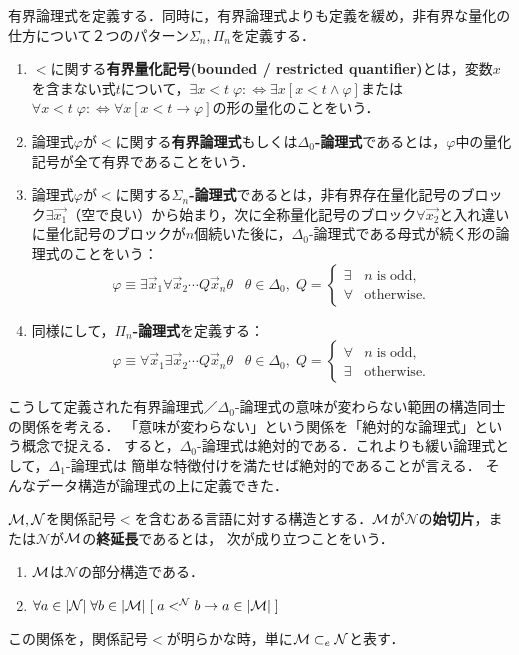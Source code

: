 \documentclass[uplatex, 12pt, dvipdfmx]{jsreport}
\begin{document}
有界論理式を定義する．同時に，有界論理式よりも定義を緩め，非有界な量化の仕方について２つのパターン$\Sigma_n,\Pi_n$を定義する．
\begin{definition}
    \begin{enumerate}
        \item $<$に関する\textbf{有界量化記号(bounded / restricted quantifier)}とは，変数$x$を含まない式$t$について，$\exists x<t\;\varphi:\Leftrightarrow\exists x[x<t\land\varphi]$または$\forall x<t\;\varphi:\Leftrightarrow\forall x[x<t\to\varphi]$の形の量化のことをいう．
        \item 論理式$\varphi$が$<$に関する\textbf{有界論理式}もしくは\textbf{$\Delta_0$-論理式}であるとは，$\varphi$中の量化記号が全て有界であることをいう．
        \item 論理式$\varphi$が$<$に関する\textbf{$\Sigma_n$-論理式}であるとは，非有界存在量化記号のブロック$\exists\vec{x_1}$（空で良い）から始まり，次に全称量化記号のブロック$\forall\vec{x_2}$と入れ違いに量化記号のブロックが$n$個続いた後に，$\Delta_0$-論理式である母式が続く形の論理式のことをいう：\[\varphi\equiv\exists\vec{x}_1\forall\vec{x}_2\cdots Q\vec{x}_n\theta\;\;\;\theta\in\Delta_0,\;Q=\begin{cases}\exists&n\;\mathrm{is\;odd},\\\forall&\mathrm{otherwise}.\end{cases}\]
        \item 同様にして，\textbf{$\Pi_n$-論理式}を定義する：\[\varphi\equiv\forall\vec{x}_1\exists\vec{x}_2\cdots Q\vec{x}_n\theta\;\;\;\theta\in\Delta_0,\;Q=\begin{cases}\forall&n\;\mathrm{is\;odd},\\\exists&\mathrm{otherwise}.\end{cases}\]
    \end{enumerate}
\end{definition}
こうして定義された有界論理式／$\Delta_0$-論理式の意味が変わらない範囲の構造同士の関係を考える．
「意味が変わらない」という関係を「絶対的な論理式」という概念で捉える．
すると，$\Delta_0$-論理式は絶対的である．これよりも緩い論理式として，$\Delta_1$-論理式は
簡単な特徴付けを満たせば絶対的であることが言える．
そんなデータ構造が論理式の上に定義できた．

\begin{definition}
    $\mathcal{M},\mathcal{N}$を関係記号$<$を含むある言語に対する構造とする．$\mathcal{M}$が$\mathcal{N}$の\textbf{始切片}，または$\mathcal{N}$が$\mathcal{M}$の\textbf{終延長}であるとは，
    次が成り立つことをいう．
    \begin{enumerate}
        \item $\mathcal{M}$は$\mathcal{N}$の部分構造である．
        \item $\forall a\in|\mathcal{N}|\;\forall b\in|\mathcal{M}|\;[\;a<^\mathcal{N}b\to a\in|\mathcal{M}|\;]$
    \end{enumerate}
    この関係を，関係記号$<$が明らかな時，単に$\mathcal{M}\subset_e\mathcal{N}$と表す．
\end{definition}
\end{document}
